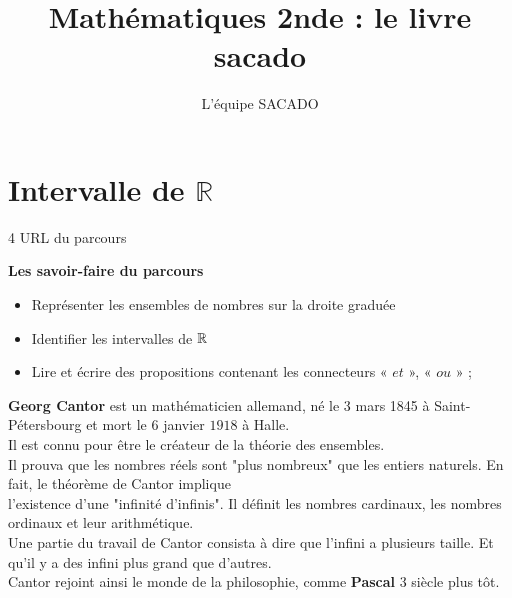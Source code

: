 



\title{Mathématiques 2nde  : le livre sacado}
\author{L'équipe SACADO}




\chapter{Intervalle de $\mathbb{R}$}{4}
{URL du parcours}
{
 \begin{CpsCol}
	\textbf{Les savoir-faire du parcours}
 	\begin{itemize}
 		\item Représenter les ensembles de nombres sur la droite graduée
 		\item Identifier les intervalles de $\mathbb R$
 		\item Lire et écrire des propositions contenant les connecteurs « $et$ », « $ou$ » ;
 	\end{itemize}
 \end{CpsCol}

\begin{His}
\textbf{Georg Cantor} est un mathématicien allemand, né le 3 mars 1845 à Saint-Pétersbourg et mort le $6$ janvier $1918$ à Halle.\\ 
Il est connu pour être le créateur de la théorie des ensembles.\\ 
Il prouva que les nombres réels sont "plus nombreux" que les entiers naturels. En fait, le théorème de Cantor implique\\ 
l'existence d'une "infinité d'infinis". Il définit les nombres cardinaux, les nombres ordinaux et leur arithmétique. \\ 
Une partie du travail de Cantor consista à dire que l'infini a plusieurs taille. Et qu'il y a des infini plus grand que d'autres. \\ 
Cantor rejoint ainsi le monde de la philosophie, comme \textbf{Pascal} 3 siècle plus tôt. \end{His}

}
